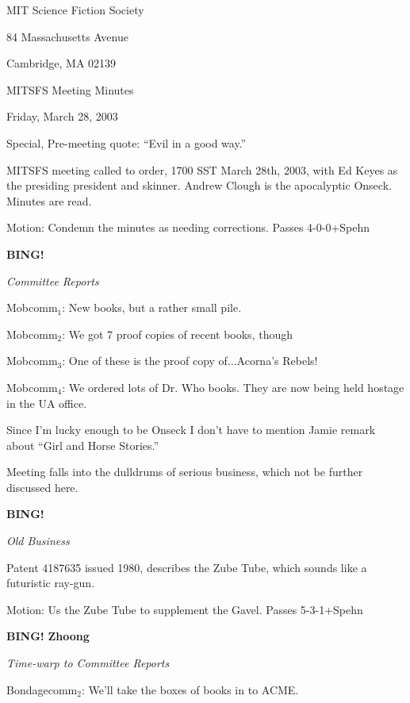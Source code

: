 \documentclass[12pt]{article}
\newcommand{\bing}{{\bf BING!} }
\newcommand{\goto}[1]{\bing \vskip 12pt \centerline{{\em{#1}}}}
\begin{document}
\begin{center}

MIT Science Fiction Society 

84 Massachusetts Avenue

Cambridge, MA 02139

\vspace{12pt}

MITSFS Meeting Minutes 

Friday, March 28, 2003

\end{center}
 
\vspace{18pt}

\setlength{\parskip}{6pt}

\noindent
Special, Pre-meeting quote:  ``Evil in a good way.''

MITSFS meeting called to order, 1700 SST March  28th, 2003, with Ed Keyes as the presiding president and skinner.  Andrew Clough is the apocalyptic Onseck.  Minutes are read.

Motion:  Condemn the minutes as needing corrections.  Passes 4-0-0+Spehn

\goto{Committee Reports}

Mobcomm$_1$:  New books, but a rather small pile.

Mobcomm$_2$:  We got 7 proof copies of recent books, though 

Mobcomm$_3$:  One of these is the proof copy of...Acorna's Rebels!

Mobcomm$_4$:  We ordered lots of Dr. Who books.  They are now being held hostage in the UA office.

Since I'm lucky enough to be Onseck I don't have to mention Jamie remark about ``Girl and Horse Stories.''

Meeting falls into the dulldrums of serious business, which not be further discussed here.

\goto{Old Business}

Patent 4187635 issued 1980, describes the Zube Tube, which sounds like a futuristic ray-gun.

Motion:  Us the Zube Tube to supplement the Gavel.  Passes 5-3-1+Spehn

\bing
{\bf Zhoong}
\begin{center}
\textit{Time-warp to Committee Reports}
\end{center}

Bondagecomm$_2$:  We'll take the boxes of books in to ACME.
\end{document}
